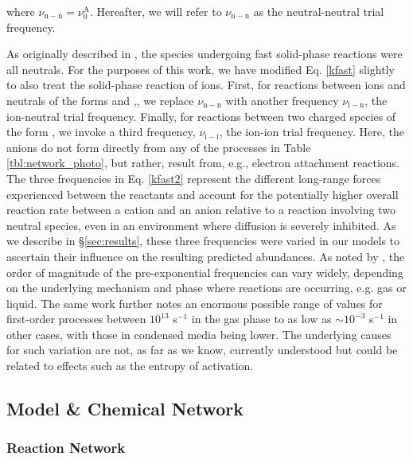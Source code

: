 \documentclass[journal=aesccq,manuscript=article,layout=twocolumn]{achemso}
\begin{document}
\noindent
where $\nu_\mathrm{n-n} = \nu_0^\mathrm{A}$. Hereafter, we will refer to $\nu_\mathrm{n-n}$ as the neutral-neutral trial frequency.

As originally described in \citet{shingledecker_simulating_2019}, the species undergoing fast solid-phase reactions were all neutrals. For the purposes of this work, we have modified Eq. \eqref{kfast} slightly to also treat the solid-phase reaction of ions. First, for reactions between ions and neutrals of the forms  and ,, we replace $\nu_\mathrm{n-n}$ with another frequency $\nu_\mathrm{i-n}$, the ion-neutral trial frequency. Finally, for reactions between two charged species of the form , we invoke a third frequency, $\nu_\mathrm{i-i}$, the ion-ion trial frequency. Here, the anions do not form directly from any of the processes in Table \ref{tbl:network_photo}, but rather, result from, e.g., electron attachment reactions. The three frequencies in Eq. \eqref{kfast2} represent the different long-range forces experienced between the reactants and account for the potentially higher overall reaction rate between a cation and an anion relative to a reaction involving two neutral species, even in an environment where diffusion is severely inhibited. As we describe in \S\ref{sec:results}, these three frequencies were varied in our models to ascertain their influence on the resulting predicted abundances. As noted by \citet{theule_thermal_2013}, the order of magnitude of the pre-exponential frequencies can vary widely, depending on the underlying mechanism and phase where reactions are occurring, e.g. gas or liquid. The same work further notes an enormous possible range of values for first-order processes between $10^{13}$ s$^{-1}$ in the gas phase to as low as $\sim10^{-3}$ s$^{-1}$ in other cases, with those in condensed media being lower. The underlying causes for such variation are not, as far as we know, currently understood but could be related to effects such as the entropy of activation. 

\subsection{Model \& Chemical Network}

\subsubsection{Reaction Network}
\end{document}
